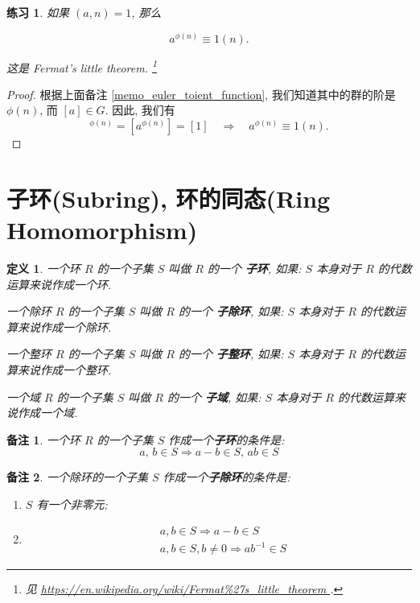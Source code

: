 \documentclass[utf8]{ctexbook}
\newtheorem{definition}{定义}[section]
\newtheorem{memo}{备注}[section]
\newtheorem{exercise}{练习}[section]
\begin{document}
\begin{exercise}
如果 $(a,n)=1$, 那么

\begin{equation}
a^{\phi(n)} \equiv 1 (n) .
\end{equation}

这是 Fermat's little theorem. \footnote{见 \url{https://en.wikipedia.org/wiki/Fermat\%27s\_little\_theorem }.}
\end{exercise}

\begin{proof}
根据上面备注 \ref{memo_euler_toient_function}, 我们知道其中的群的阶是 $\phi(n)$, 而 $[a] \in G$. 因此, 我们有
\begin{equation}
[a]^{\phi(n)} = [a ^{\phi(n)}] = [1] \quad \Rightarrow \quad a^{\phi(n)} \equiv 1(n) .
\end{equation}



\end{proof}


\section{子环(Subring), 环的同态(Ring Homomorphism)}

\begin{definition}
一个环 $R$ 的一个子集 $S$ 叫做 $R$ 的一个 \textbf{子环}, 如果: $S$ 本身对于 $R$ 的代数运算来说作成一个环.

一个除环 $R$ 的一个子集 $S$ 叫做 $R$ 的一个 \textbf{子除环}, 如果: $S$ 本身对于 $R$ 的代数运算来说作成一个除环.

一个整环 $R$ 的一个子集 $S$ 叫做 $R$ 的一个 \textbf{子整环}, 如果: $S$ 本身对于 $R$ 的代数运算来说作成一个整环.

一个域 $R$ 的一个子集 $S$ 叫做 $R$ 的一个 \textbf{子域}, 如果: $S$ 本身对于 $R$ 的代数运算来说作成一个域.
\end{definition}

\begin{memo}
一个环 $R$ 的一个子集 $S$ 作成一个\textbf{子环}的条件是:
\begin{equation}
a, \, b \in S \Longrightarrow a-b \in S, \, ab \in S
\end{equation}
\end{memo}

\begin{memo}\label{memo_division_subring}
一个除环的一个子集 $S$ 作成一个\textbf{子除环}的条件是:
\begin{enumerate}
\item{$S$ 有一个非零元;}
\item{
\begin{align*}
& a, b \in S \Longrightarrow a-b \in S \\
& a, b \in S, b \neq 0 \Longrightarrow ab^{-1} \in S 
\end{align*}
}
\end{enumerate}
\end{memo}
\end{document}
